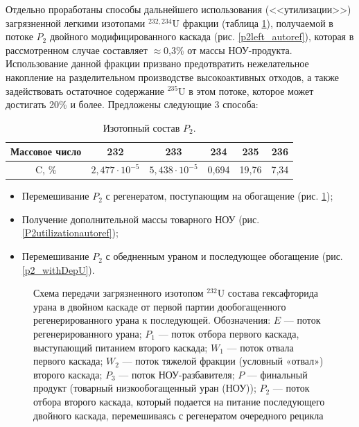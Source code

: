 Отдельно проработаны способы дальнейшего использования (<<утилизации>>) загрязненной легкими изотопами $^{232,234}$U фракции (таблица \ref{P2_compositions_autoref}), получаемой в потоке $P_2$ двойного модифицированного каскада (рис. \ref{p2left_autoref}), которая в рассмотренном случае составляет $\approx$0,3\% от массы НОУ-продукта. Использование данной фракции призвано предотвратить нежелательное накопление на разделительном производстве высокоактивных отходов, а также задействовать остаточное содержание $^{235}$U в этом потоке, которое может достигать 20\% и более. Предложены следующие 3 способа: 

\begin{table}[h]
  \centering
  \caption{{Изотопный состав $P_2$.{\label{P2_compositions_autoref}}}}
    \begin{tabular}{|c|c|c|c|c|c|}
    \hline Массовое число & 232 & 233 & 234 & 235 & 236 \\
    \hline C, \% & $2,477\cdot10^{-5}$ & $5,438\cdot10^{-5}$ & 0,694 & 19,76 & 7,34 \\ \hline
  \end{tabular}
\end{table}

\begin{itemize}
  \item Перемешивание $P_2$ с регенератом, поступающим на обогащение (рис. \ref{P2utilizationRingautoref});
  \item Получение дополнительной массы товарного НОУ (рис. \ref{P2utilizationautoref});
  \item Перемешивание $P_2$ с обедненным ураном и последующее обогащение (рис. \ref{p2_withDepU}).
\end{itemize}

\begin{figure}[ht]
  \caption{Схема передачи загрязненного изотопом $^{232}$U состава гексафторида урана в двойном каскаде от первой партии дообогащенного регенерированного урана к последующей. Обозначения: $E$ --- поток регенерированного урана; $P_1$ --- поток отбора первого каскада, выступающий питанием второго каскада; $W_1$ --- поток отвала первого каскада; $W_2$ --- поток тяжелой фракции (условный «отвал») второго каскада; $P_3$ --- поток НОУ-разбавителя; $P$ --- финальный продукт (товарный низкообогащенный уран (НОУ)); $P_2$ --- поток отбора второго каскада, который подается на питание последующего двойного каскада, перемешиваясь с регенератом очередного рецикла}\label{P2utilizationRingautoref}
\end{figure}

